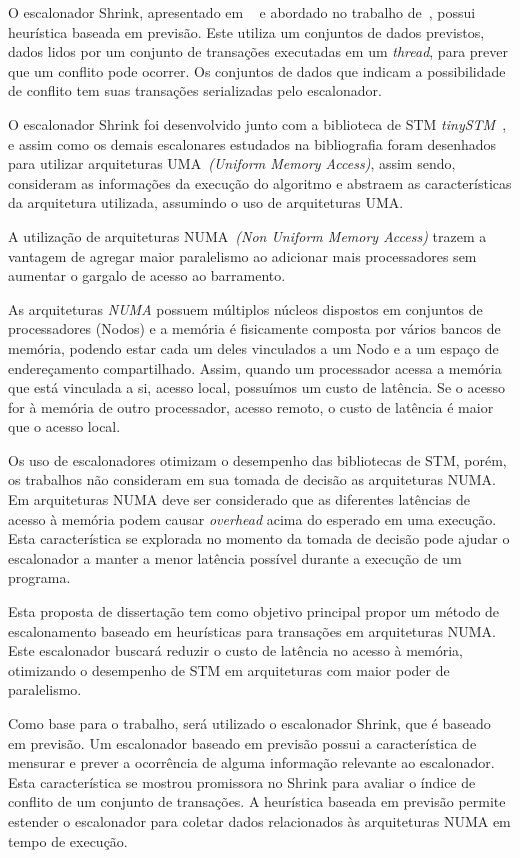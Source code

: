 \documentclass[diss-proposta,nocipinfo]{texufpel}
\begin{document}
O escalonador Shrink, apresentado em ~\cite{dragojevic09} e abordado no trabalho de~\cite{sanzo17}, possui heurística baseada em previsão. Este utiliza um conjuntos de dados previstos, dados lidos por um conjunto de transações executadas em um \emph{thread}, para prever que um conflito pode ocorrer. Os conjuntos de dados que indicam a possibilidade de conflito tem suas transações serializadas pelo escalonador.

O escalonador Shrink foi desenvolvido junto com a biblioteca de STM \emph{tinySTM}~\cite{TINY}, e assim como os demais escalonares estudados na bibliografia foram desenhados para utilizar arquiteturas UMA~\emph{(Uniform Memory Access)}, assim sendo, consideram as informações da execução do algoritmo e abstraem as características da arquitetura utilizada, assumindo o uso de arquiteturas UMA.

A utilização de arquiteturas NUMA~\emph{(Non Uniform Memory Access)} trazem a vantagem de agregar maior paralelismo ao adicionar mais processadores sem aumentar o gargalo de acesso ao barramento.

As arquiteturas \emph{NUMA} possuem múltiplos núcleos dispostos em conjuntos de processadores (Nodos) e a memória é fisicamente composta por vários bancos de memória, podendo estar cada um deles vinculados a um Nodo e a um espaço de endereçamento compartilhado. Assim, quando um processador acessa a memória que está vinculada a si, acesso local, possuímos um custo de latência. Se o acesso for à memória de outro processador, acesso remoto, o custo de latência é maior que o acesso local.

Os uso de escalonadores otimizam o desempenho das bibliotecas de STM, porém, os trabalhos não consideram em sua tomada de decisão as arquiteturas NUMA. Em arquiteturas NUMA deve ser considerado que as diferentes latências de acesso à memória podem causar \emph{overhead} acima do esperado em uma execução. Esta característica se explorada no momento da tomada de decisão pode ajudar o escalonador a manter a menor latência possível durante a execução de um programa.

Esta proposta de dissertação tem como objetivo principal propor um método de escalonamento baseado em heurísticas para transações em arquiteturas NUMA. Este escalonador buscará reduzir o custo de latência no acesso à memória, otimizando o desempenho de STM em arquiteturas com maior poder de paralelismo.

Como base para o trabalho, será utilizado o escalonador Shrink, que é baseado em previsão. Um escalonador baseado em previsão possui a característica de mensurar e prever a ocorrência de alguma informação relevante ao escalonador. Esta característica se mostrou promissora no Shrink para avaliar o índice de conflito de um conjunto de transações. A heurística baseada em previsão permite estender o escalonador para coletar dados relacionados às arquiteturas NUMA em tempo de execução.
\end{document}

